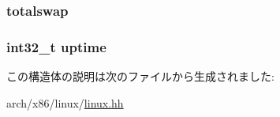 \label{structX86Linux32_1_1tgt__sysinfo_aec5052a5ea8190b75fe495a9908ab9e9}
\hypertarget{structX86Linux32_1_1tgt__sysinfo_affcb72366c4cc75f904c0a7bf7c72a47}{
\subsubsection[{totalswap}]{ {\bf totalswap}}}
\label{structX86Linux32_1_1tgt__sysinfo_affcb72366c4cc75f904c0a7bf7c72a47}
\hypertarget{structX86Linux32_1_1tgt__sysinfo_acaed7912557581c7ea77bf8c1ae4ccf2}{
\subsubsection[{uptime}]{\setlength{\rightskip}{0pt plus 5cm}int32\_\-t {\bf uptime}}}
\label{structX86Linux32_1_1tgt__sysinfo_acaed7912557581c7ea77bf8c1ae4ccf2}


この構造体の説明は次のファイルから生成されました:\begin{DoxyCompactItemize}
\item 
arch/x86/linux/\hyperlink{arch_2x86_2linux_2linux_8hh}{linux.hh}\end{DoxyCompactItemize}
